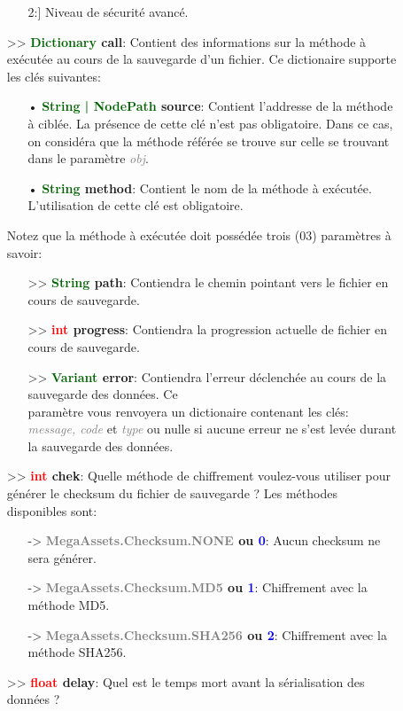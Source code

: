 \documentclass[a4paper, 11pt]{article}
\begin{document}
\begin{description}
\begin{itemize}
\begin{itemize}
{				{2}}:] Niveau de sécurité avancé.
			\end{itemize}
			\item [>> \textbf{\textcolor{darkgreen}{Dictionary} call}:] Contient des informations sur la
			méthode à exécutée au cours de la sauvegarde d'un fichier. Ce dictionaire supporte les clés
			suivantes:
			\begin{itemize}
			   \item[• \textbf{\textcolor{darkgreen}{String | NodePath} source}:] Contient l'addresse de la 
			   méthode à ciblée. La présence de cette clé n'est pas obligatoire. Dans ce cas, on considéra
			   que la méthode référée se trouve sur celle se trouvant dans le paramètre
			   \textit{\textcolor{gray}{obj}}.
			   \item[• \textbf{\textcolor{darkgreen}{String} method}:] Contient le nom de la méthode à 
			   exécutée. L'utilisation de cette clé est obligatoire.
			\end{itemize}
			Notez que la méthode à exécutée doit possédée trois (03) paramètres à savoir:
			\begin{itemize}
				\item [>> \textbf{\textcolor{darkgreen}{String} path}:] Contiendra le chemin pointant vers
				le fichier en cours de sauvegarde.
				\item [>> \textbf{\textcolor{red}{int} progress}:] Contiendra la progression actuelle de
				fichier en cours de sauvegarde.
				\item [>> \textbf{\textcolor{darkgreen}{Variant} error}:] Contiendra l'erreur déclenchée au
				cours de la sauvegarde des données. Ce \\paramètre vous renvoyera un dictionaire contenant
				les clés: \textit{\textcolor{gray}{message, code}} et \textit{\textcolor{gray}{type}} ou
				nulle si aucune erreur ne s'est levée durant la sauvegarde des données.
			\end{itemize}
			\item [>> \textbf{\textcolor{red}{int} chek}:] Quelle méthode de chiffrement voulez-vous 
			utiliser pour générer le checksum du fichier de sauvegarde ? Les méthodes disponibles sont:
			\begin{itemize}
				\item [-> \textbf{\textcolor{gray}{MegaAssets.Checksum.NONE} ou \textcolor{blue}{0}}:] Aucun 
				checksum ne sera générer.
				\item [-> \textbf{\textcolor{gray}{MegaAssets.Checksum.MD5} ou \textcolor{blue}{1}}:] 
				Chiffrement avec la méthode MD5.
				\item [-> \textbf{\textcolor{gray}{MegaAssets.Checksum.SHA256} ou \textcolor{blue}{2}}:] 
				Chiffrement avec la méthode SHA256.
			\end{itemize}
			\item [>> \textbf{\textcolor{red}{float} delay}:] Quel est le temps mort avant la sérialisation
			des données ?\\
		\end{itemize}
	\end{description}
\end{document}
